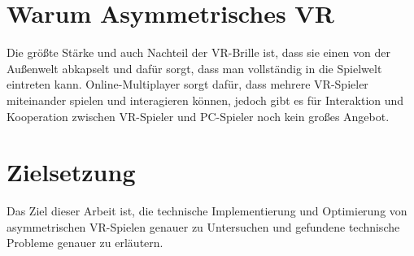 \section{Warum Asymmetrisches VR}
Die größte Stärke und auch Nachteil der VR-Brille ist, dass sie einen von der Außenwelt abkapselt und dafür sorgt, dass man vollständig in die Spielwelt eintreten kann. Online-Multiplayer sorgt dafür, dass mehrere VR-Spieler miteinander spielen und interagieren können, jedoch gibt es für Interaktion und Kooperation zwischen VR-Spieler und PC-Spieler noch kein großes Angebot.

\section{Zielsetzung}
Das Ziel dieser Arbeit ist, die technische Implementierung und Optimierung von asymmetrischen VR-Spielen genauer zu Untersuchen und gefundene technische Probleme genauer zu erläutern.


